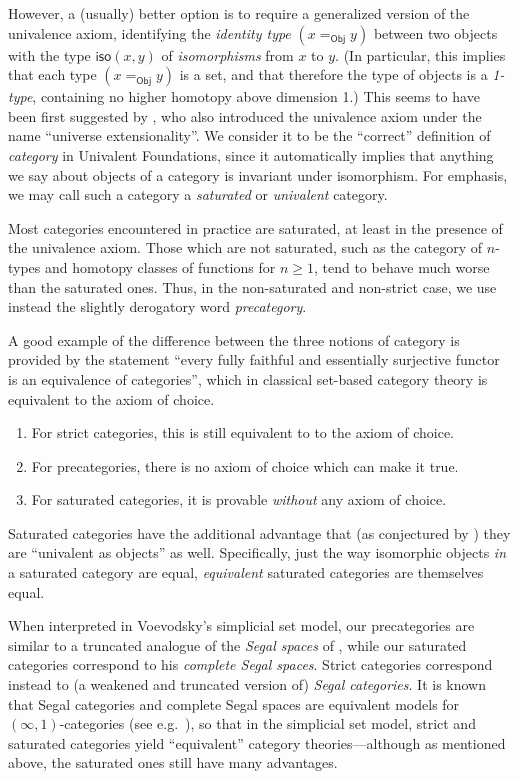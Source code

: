 \documentclass{mscs}
\numberwithin{equation}{section}
\begin{document}
However, a (usually) better option is to require a generalized version of the univalence axiom, identifying the \emph{identity type} $(x=_{\mathsf{Obj}} y)$ between two objects with the type $\mathsf{iso}(x,y)$ of \emph{isomorphisms} from $x$ to $y$.
(In particular, this implies that each type $(x=_{\mathsf{Obj}} y)$ is a set, and that therefore the type of objects is a \emph{1-type}, containing no higher homotopy above dimension 1.)
This seems to have been first suggested by \textcite{hs:gpd-typethy}, who also introduced the univalence axiom under the name ``universe extensionality''.
We consider it to be the ``correct'' definition of \emph{category} in Univalent Foundations, since it automatically implies that anything we say about objects of a category is invariant under isomorphism.
For emphasis, we may call such a category a \emph{saturated} or \emph{univalent} category.

Most categories encountered in practice are saturated, at least in the presence of the univalence axiom.
Those which are not saturated, such as the category of $n$-types and homotopy classes of functions for $n\ge 1$, tend to behave much worse than the saturated ones.
Thus, in the non-saturated and non-strict case, we use instead the slightly derogatory word \emph{precategory}.

A good example of the difference between the three notions of category is provided by the statement ``every fully faithful and essentially surjective functor is an equivalence of categories'', which in classical set-based category theory is equivalent to the axiom of choice.
\begin{enumerate}
\item For strict categories, this is still equivalent to to the axiom of choice.
\item For precategories, there is no axiom of choice which can make it true.
\item For saturated categories, it is provable \emph{without} any axiom of choice.\label{item:satnoac}
\end{enumerate}
Saturated categories have the additional advantage that (as conjectured by \textcite{hs:gpd-typethy}) they are ``univalent as objects'' as well.
Specifically, just the way isomorphic objects \emph{in} a saturated category are equal, \emph{equivalent} saturated categories are themselves equal.

When interpreted in Voevodsky's simplicial set model, our precategories are similar to a truncated analogue of the \emph{Segal spaces} of \textcite[Sec.~14]{rezk01css}, while our saturated categories correspond to his \emph{complete Segal spaces}.
Strict categories correspond instead to (a weakened and truncated version of) \emph{Segal categories}.
It is known that Segal categories and complete Segal spaces are equivalent models for $(\infty,1)$-categories (see e.g.~\textcite{bergner:infty-one}), so that in the simplicial set model, strict and saturated categories yield ``equivalent'' category theories---although as mentioned above, the saturated ones still have many advantages.
\end{document}
